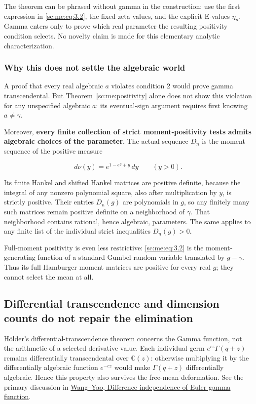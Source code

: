 \documentclass[11pt,a4paper]{article}
\theoremstyle{definition}
\theoremstyle{remark}
\theoremstyle{plain}
\numberwithin{equation}{section}
\begin{document}
The theorem can be phrased without gamma in the construction: use the
first expression in \eqref{sc:me:eq:3.2}, the fixed zeta values, and the explicit
E-values \(\eta_n\). Gamma enters only to prove which real parameter the
resulting positivity condition selects. No novelty claim is made for
this elementary analytic characterization.

\subsubsection{Why this does not settle the algebraic
world}\label{sc:me:why-this-does-not-settle-the-algebraic-world}

A proof that every real algebraic \(a\) violates condition 2 would prove
gamma transcendental. But Theorem~\ref{sc:me:positivity} alone does not show this violation
for any unspecified algebraic \(a\): its eventual-sign argument requires
first knowing \(a\ne\gamma\).

Moreover, \textbf{every finite collection of strict moment-positivity
tests admits algebraic choices of the parameter}. The actual sequence
\(D_n\) is the moment sequence of the positive measure

\[
d\nu(y)=e^{1-e^y+y}\,dy\qquad(y>0).
\tag{ME.3.7}\label{sc:me:eq:3.7}
\]

Its finite Hankel and shifted Hankel matrices are positive definite,
because the integral of any nonzero polynomial square, also after
multiplication by \(y\), is strictly positive. Their entries \(D_n(g)\)
are polynomials in \(g\), so any finitely many such matrices remain
positive definite on a neighborhood of \(\gamma\). That neighborhood
contains rational, hence algebraic, parameters. The same applies to any
finite list of the individual strict inequalities \(D_n(g)>0\).

Full-moment positivity is even less restrictive: \eqref{sc:me:eq:3.2} is the
moment-generating function of a standard Gumbel random variable
translated by \(g-\gamma\). Thus its full Hamburger moment matrices are
positive for every real \(g\); they cannot select the mean at all.

\subsection{Differential transcendence and dimension counts do not
repair the
elimination}\label{sc:me:differential-transcendence-and-dimension-counts-do-not-repair-the-elimination}

Hölder's differential-transcendence theorem concerns the Gamma function,
not the arithmetic of a selected derivative value. Each individual germ
\(e^{cz}\Gamma(q+z)\) remains differentially transcendental over
\(\mathbb C(z)\): otherwise multiplying it by the differentially
algebraic function \(e^{-cz}\) would make \(\Gamma(q+z)\) differentially
algebraic. Hence this property also survives the free-mean deformation.
See the primary discussion in
\href{https://arxiv.org/abs/2303.02767}{Wang--Yao, Difference
independence of Euler gamma function}.
\end{document}
